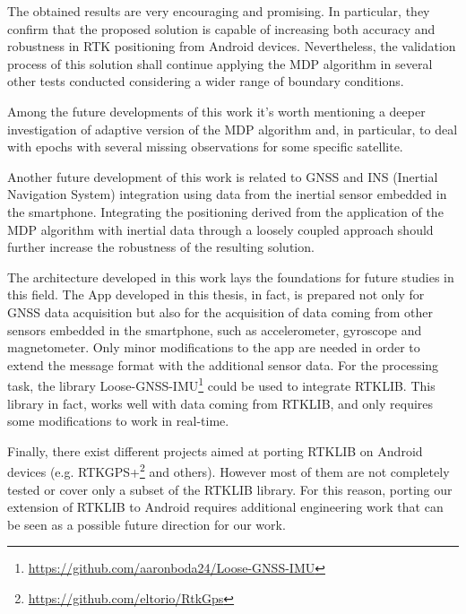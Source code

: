 The obtained results are  very encouraging and promising. In particular, they confirm that the proposed solution is capable of increasing both accuracy and robustness in  RTK positioning from Android devices. Nevertheless, the validation process of this solution shall continue applying the MDP algorithm in several other tests conducted considering a wider range of boundary conditions.  

Among the future developments of this work it's worth mentioning a deeper investigation of adaptive version of  the MDP algorithm and, in particular, to deal with epochs with several missing observations for some specific satellite.

Another future development of this work is related to  GNSS and INS (Inertial Navigation System) integration using data from the inertial sensor embedded in the smartphone. Integrating the positioning derived from the application of the MDP algorithm with inertial data through a loosely coupled approach should further increase the robustness of the resulting solution. 

The architecture developed in this work lays the foundations for future studies in this field. The App developed in this thesis, in fact, is prepared not only for GNSS data acquisition but also for the acquisition of data coming from other sensors embedded in the smartphone, such as accelerometer, gyroscope and magnetometer. Only minor modifications to the app are needed in order to extend the message format with the additional sensor data. For the processing task, the library Loose-GNSS-IMU\footnote{\url{https://github.com/aaronboda24/Loose-GNSS-IMU}} could be used to integrate RTKLIB.
This library in fact, works well with data coming from RTKLIB, and only requires some modifications to work in real-time.

Finally, there exist different projects aimed at porting RTKLIB on Android devices (e.g. RTKGPS+\footnote{\url{https://github.com/eltorio/RtkGps}} and others). However most of them are not completely tested or cover only a subset of the RTKLIB library.
For this reason, porting our extension of RTKLIB to Android requires additional engineering work that can be seen as a possible future direction for our work.

